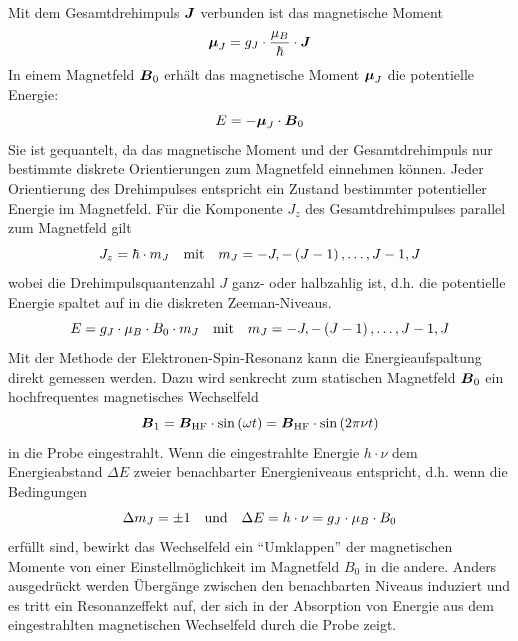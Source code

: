 \documentclass[ngerman]{scrartcl}
\begin{document}
Mit dem Gesamtdrehimpuls $\vb*{J}$ verbunden ist das magnetische Moment
\begin{equation}
    \vb*{\mu}_J = g_J \cdot \frac{\mu_B}{\hbar}\cdot \vb*{J}
\end{equation}
In einem Magnetfeld $\vb*{B}_0$ erhält das magnetische Moment $\vb*{\mu}_J$ die potentielle Energie:
\begin{equation}
    E = - \vb*{\mu}_J \cdot \vb*{B}_0
\end{equation}
Sie ist gequantelt, da das magnetische Moment und der Gesamtdrehimpuls nur bestimmte diskrete Orientierungen zum Magnetfeld einnehmen können. Jeder Orientierung des Drehimpulses entspricht ein Zustand bestimmter potentieller Energie im Magnetfeld. Für die Komponente $J_z$ des Gesamtdrehimpulses parallel zum Magnetfeld gilt
\begin{equation}
    J_z = \hbar \cdot m_J \qq{mit} m_J = -J, -\left(J-1\right), \dots, J-1, J
\end{equation}
wobei die Drehimpulsquantenzahl $J$ ganz- oder halbzahlig ist, d.h. die potentielle Energie spaltet auf in die diskreten Zeeman-Niveaus.
\begin{equation}
    E = g_J \cdot \mu_B \cdot B_0 \cdot m_J \qq{mit} m_J = -J, -\left(J-1\right), \dots, J-1, J
\end{equation}
Mit der Methode der Elektronen-Spin-Resonanz kann die Energieaufspaltung direkt gemessen werden. Dazu wird senkrecht zum statischen Magnetfeld $\vb*{B}_0$ ein hochfrequentes magnetisches Wechselfeld
\begin{equation}
    \vb*{B}_1 = \vb*{B}_{\text{HF}} \cdot \sin\left(\omega t\right) = \vb*{B}_{\text{HF}} \cdot \sin\left(2 \pi \nu t\right)
\end{equation}
in die Probe eingestrahlt. Wenn die eingestrahlte Energie $h \cdot \nu$ dem Energieabstand $\Delta E$ zweier benachbarter Energieniveaus entspricht, d.h. wenn die Bedingungen
\begin{equation}
    \label{eq:V}
    \Delta m_J = \pm 1 \qq{und} \Delta E = h \cdot \nu = g_J \cdot \mu_B \cdot B_0
\end{equation}
erfüllt sind, bewirkt das Wechselfeld ein \enquote{Umklappen} der magnetischen Momente von einer Einstellmöglichkeit im Magnetfeld $B_0$ in die andere. Anders ausgedrückt werden Übergänge zwischen den benachbarten Niveaus induziert und es tritt ein Resonanzeffekt auf, der sich in der Absorption von Energie aus dem eingestrahlten magnetischen Wechselfeld durch die Probe zeigt.
%
\end{document}
